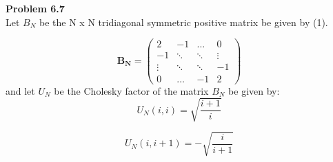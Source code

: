 \documentclass{article}
\begin{document}
\section{}
\textbf {Problem 6.7} \\
Let \(B_N\) be the N x N  tridiagonal symmetric positive matrix be given by (1). 

\begin{equation}
	\mathbf{B_N} = \left(
	\begin{array}{cccc}
	2 & -1 & \ldots & 0\\
	-1 & \ddots & \ddots & \vdots \\
	\vdots & \ddots & \ddots & -1 \\
	0 & \ldots & -1 & 2
	\end{array} \right)
\end{equation}
and let \(U_N\) be the Cholesky factor  of the matrix \(B_N\) be given by:
\begin{equation}
	U_N(i,i) = \sqrt{\frac{i+1}{i}}
\end{equation}

\begin{equation}
	U_N(i,i+1) = -\sqrt{\frac{i}{i+1}}
\end{equation}
\end{document}
